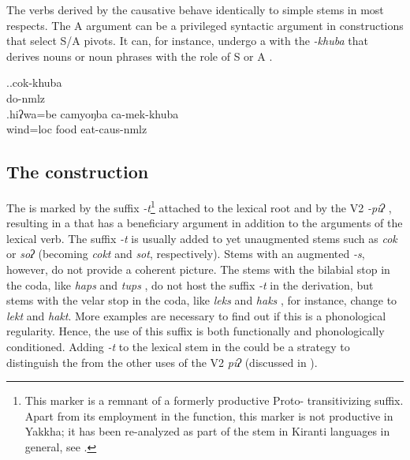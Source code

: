   
 
The verbs derived by the causative behave identically to simple stems in most respects. The A argument can be a privileged syntactic argument in constructions that select S/A pivots. It can, for instance, undergo a  with the  \emph{-khuba} that derives nouns or noun phrases with the role of S or A \Next.  
 
 \ex.\ag.cok-khuba\\
do{\sc -nmlz}\\
\bg.hiʔwa=be    camyoŋba ca-mek-khuba\\
wind{\sc =loc} food eat{\sc -caus-nmlz}\\




\subsection{The  construction}\label{benefactive}

The  is marked by the suffix \emph{-t}\footnote{This marker is a remnant of a  formerly productive Proto-  transitivizing suffix. Apart from its employment in the  function, this marker is not productive in Yakkha; it has been re-analyzed as part of the stem in Kiranti languages in general, see .} attached to the lexical root and by the V2 \emph{-piʔ} , resulting in a  that has a beneficiary argument in addition to the arguments of the lexical verb. The suffix \emph{-t} is usually added to yet unaugmented stems such as \emph{cok}  or \emph{soʔ}  (becoming \emph{cokt} and \emph{sot}, respectively). Stems with an augmented \emph{-s}, however, do not provide a coherent picture. The stems with the bilabial stop in the coda, like \emph{haps}  and \emph{tups} , do not host the suffix \emph{-t} in the  derivation, but stems with the velar stop in the coda, like \emph{leks}  and \emph{haks} , for instance, change to \emph{lekt} and \emph{hakt}. More examples are necessary to find out if this is a phonological regularity. Hence, the use of this suffix is both functionally and phonologically conditioned. Adding \emph{-t} to the lexical stem in the  could be a strategy to distinguish the  from the other uses of the V2 \emph{piʔ} (discussed in ).

